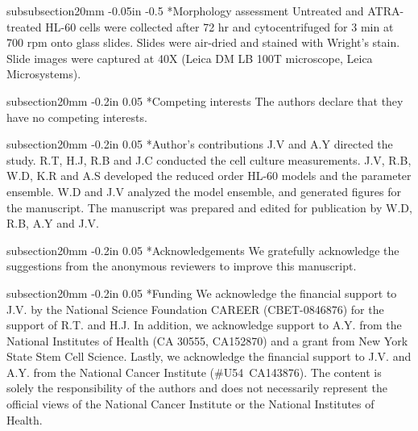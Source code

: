 \documentclass[12pt]{article}
\makeatletter
\renewcommand\subsubsection{\@startsection
	{subsubsection}{2}{0mm}
	{-0.05in}
	{-0.5\baselineskip}
	{\normalfont\normalsize\itshape}}
\renewcommand\section{\@startsection
	{subsection}{2}{0mm}
	{-0.2in}
	{0.05\baselineskip}
	{\normalfont\large\bfseries}}
\makeatother
\begin{document}
\subsubsection*{Morphology assessment}
Untreated and ATRA-treated HL-60 cells were collected after 72 hr and cytocentrifuged for 3 min at 700 rpm onto glass slides.
Slides were air-dried and stained with Wright’s stain. Slide images were captured at 40X (Leica DM LB 100T microscope, Leica Microsystems).

\clearpage

\section*{Competing interests}
The authors declare that they have no competing interests.

\section*{Author's contributions}
J.V and A.Y directed the study. R.T, H.J, R.B and J.C conducted the cell culture measurements.
J.V, R.B, W.D, K.R and A.S developed the reduced order HL-60 models and the parameter ensemble.
W.D and J.V analyzed the model ensemble, and generated figures for the manuscript.
The manuscript was prepared and edited for publication by W.D, R.B, A.Y and J.V.

\section*{Acknowledgements}
We gratefully acknowledge the suggestions from the anonymous reviewers to improve this manuscript.

\section*{Funding}
We acknowledge the financial support to J.V. by the National Science Foundation CAREER (CBET-0846876) for the support of R.T. and H.J.
In addition, we acknowledge support to A.Y. from the National Institutes of Health (CA 30555, CA152870)
and a grant from New York State Stem Cell Science.
Lastly, we acknowledge the financial support to J.V. and A.Y. from the National Cancer Institute (\#U54~CA143876).
The content is solely the responsibility of the authors and does not necessarily
represent the official views of the National Cancer Institute or the National Institutes of Health.

\clearpage
\end{document}
